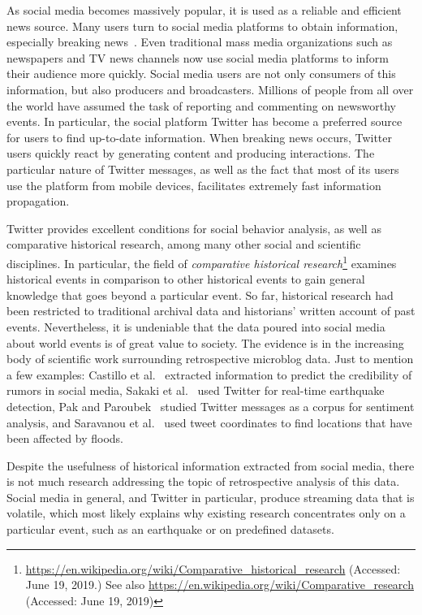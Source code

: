 As social media becomes massively popular, it is used as a reliable and
efficient news source.  
%
Many users turn to social media platforms to obtain information, especially
breaking news~\cite{Rogers:2013:DTT:2464464.2464511}. 
%
Even traditional mass media organizations such as newspapers and TV news
channels now use social media platforms to inform their audience more quickly.
%
Social media users are not only consumers of this information, but also
producers and broadcasters. 
%
Millions of people from all over the world have assumed the task of reporting
and commenting on newsworthy events.  
%
In particular, the social platform Twitter has become a preferred source for
users to find up-to-date information.  
%
When breaking news occurs, Twitter users quickly react by generating content and
producing interactions.  
%
The particular nature of Twitter messages, as well as the fact that most of its
users use the platform from mobile devices, facilitates extremely fast
information propagation.

%
Twitter provides excellent conditions for social behavior analysis, as well as
comparative historical research, among many other social and scientific
disciplines.  
%
In particular, the field of {\em comparative historical
research}\footnote{\url{https://en.wikipedia.org/wiki/Comparative_historical_research}
(Accessed: June 19, 2019.) See also
\url{https://en.wikipedia.org/wiki/Comparative_research} (Accessed: June 19,
2019)} examines historical events in comparison to other historical events to
gain general knowledge that goes beyond a particular event. 
%
So far, historical research had been restricted to traditional archival data and
historians' written account of past events. 
%
Nevertheless, it is undeniable that the data poured into social media about
world events is of great value to society. 
%
The evidence is in the increasing body of scientific work surrounding retrospective
microblog data.  
%
Just to mention a few examples: Castillo et al.~\cite{castillo2011information}
extracted information to predict the credibility of rumors in social media,
Sakaki et al.~\cite{Sakaki2010} used Twitter for real-time earthquake detection,
Pak and Paroubek~\cite{Pak:Twitter:2010} studied Twitter messages as a corpus
for sentiment analysis, and Saravanou et al.~\cite{Saravanou:Twitter:2015} used
tweet coordinates to find locations that have been affected by floods.


Despite the usefulness of historical information extracted from social media,
there is not much research addressing the topic of retrospective analysis of
this data.
%
Social media in general, and Twitter in particular, produce streaming data that
is volatile, which most likely explains why existing research concentrates only
on a particular event, such as an earthquake or on predefined datasets.

